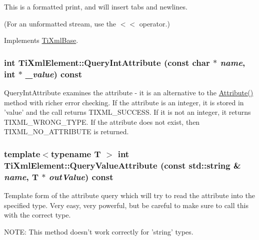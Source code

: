 This is a formatted print, and will insert tabs and newlines.

(For an unformatted stream, use the $<$$<$ operator.) 

Implements \hyperlink{class_ti_xml_base_a0de56b3f2ef14c65091a3b916437b512}{TiXmlBase}.\hypertarget{class_ti_xml_element_aea0bfe471380f281c5945770ddbf52b9}{
\subsubsection[{QueryIntAttribute}]{\setlength{\rightskip}{0pt plus 5cm}int TiXmlElement::QueryIntAttribute (const char $\ast$ {\em name}, \/  int $\ast$ {\em \_\-value}) const}}
\label{class_ti_xml_element_aea0bfe471380f281c5945770ddbf52b9}
QueryIntAttribute examines the attribute -\/ it is an alternative to the \hyperlink{class_ti_xml_element_ae419a442a9701a62b0c3d8fd1cbdd12d}{Attribute()} method with richer error checking. If the attribute is an integer, it is stored in 'value' and the call returns TIXML\_\-SUCCESS. If it is not an integer, it returns TIXML\_\-WRONG\_\-TYPE. If the attribute does not exist, then TIXML\_\-NO\_\-ATTRIBUTE is returned. \hypertarget{class_ti_xml_element_ae3b9a03b0a56663a40801c7256683576}{
\subsubsection[{QueryValueAttribute}]{\setlength{\rightskip}{0pt plus 5cm}template$<$typename T $>$ int TiXmlElement::QueryValueAttribute (const std::string \& {\em name}, \/  T $\ast$ {\em outValue}) const}}
\label{class_ti_xml_element_ae3b9a03b0a56663a40801c7256683576}
Template form of the attribute query which will try to read the attribute into the specified type. Very easy, very powerful, but be careful to make sure to call this with the correct type.

NOTE: This method doesn't work correctly for 'string' types.


